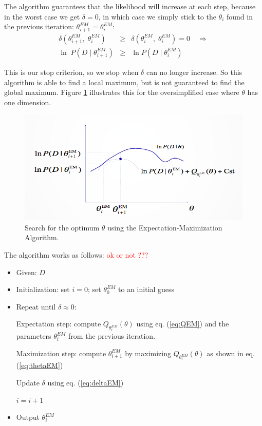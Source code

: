 The algorithm guarantees that the likelihood will increase at each step, because in the worst case we get $\delta = 0$, in which case we simply stick to the $\theta_i$ found in the previous iteration: $\theta_{i+1}^{EM} = \theta_i^{EM}$:
\begin{eqnarray}
\delta(\theta_{i+1}^{EM}, \; \theta_i^{EM}) & \ge & 
\delta(\theta_i^{EM},    \; \theta_i^{EM}) = 0
\quad \Rightarrow
\\
\ln \; P(D \; | \; \theta_{i+1}^{EM}) & \ge & \ln P(D \; | \; \theta_i^{EM})
\end{eqnarray}

This is our stop criterion, so we stop when $\delta$ can no longer increase. So this algorithm is able to find a local maximum, but is not guaranteed to find the global maximum. Figure \ref{fig:emcurve} illustrates this for the oversimplified case where $\theta$ has one dimension.

\begin{figure}[!htb]
\centerline{\includegraphics[width=.8\linewidth]{figs/EMcurve.png}}
\caption{Search for the optimum $\theta$ using the Expectation-Maximization Algorithm.}\label{fig:emcurve}
\end{figure}

The algorithm works as follows: \textcolor{red}{ok or not ???}
\begin{itemize}
\item Given: $D$
\item Initialization: set $i=0$; set $\theta_0^{EM}$ to an initial guess
\item Repeat until $\delta \approx 0$:

Expectation step: compute $Q_{\theta_i^{EM}}(\theta)$ using eq. (\ref{eq:QEM}) and the parameters $\theta_{i}^{EM}$ from the previous iteration.

Maximization step: compute $\theta_{i+1}^{EM}$ by maximizing $Q_{\theta_i^{EM}}(\theta)$ as shown in eq. (\ref{eq:thetaEM})

Update $\delta$ using eq. (\ref{eq:deltaEM})

$i = i + 1$

\item Output $\theta_i^{EM}$
\end{itemize}

